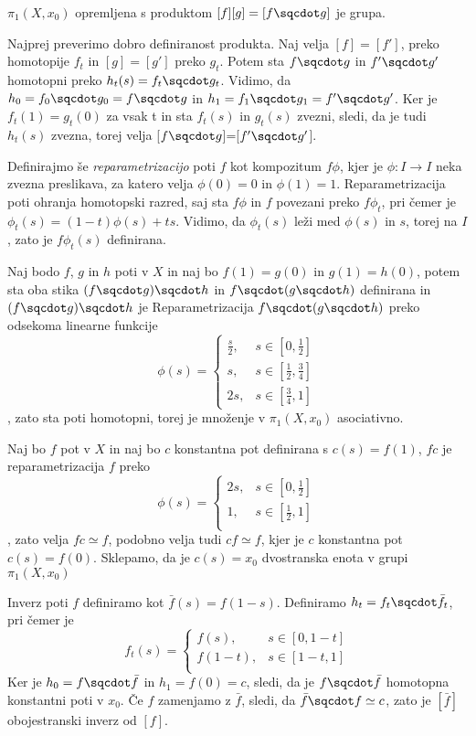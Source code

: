 \begin{izrek}
    $\pi_1(X,x_0)$ opremljena s produktom $[f][g] = [f\sqcdot g]$ je grupa.
\end{izrek}

\begin{dokaz}
    Najprej preverimo dobro definiranost produkta. Naj velja $[f]=[f']$, preko homotopije $f_t$ in $[g]=[g']$ preko $g_t$. Potem sta $f\sqcdot g$ in $f'\sqcdot g'$ homotopni preko
    $h_t(s) =f_t \sqcdot g_t$. Vidimo, da $h_0=f_0 \sqcdot g_0=f\sqcdot g$ in $h_1=f_1 \sqcdot g_1=f'\sqcdot g'$. Ker je $f_t(1)=g_t(0)$ za vsak t in sta $f_t(s)$ in $g_t(s)$ zvezni, sledi, da je tudi $h_t(s)$ zvezna, torej velja [$f\sqcdot g$]=[$f'\sqcdot g'$].

    Definirajmo še \textit{reparametrizacijo} poti $f$ kot kompozitum $f \phi$, kjer je $\phi: I \rightarrow I$ neka zvezna preslikava, za katero velja $\phi(0)= 0$ in $\phi(1)=1$. Reparametrizacija poti ohranja homotopski razred, saj sta $f\phi$ in $f$ povezani preko $f\phi_t$, pri čemer je $\phi_t(s)=(1-t)\phi(s)+ts$. Vidimo, da $\phi_t(s)$ leži med $\phi(s)$ in $s$, torej na $I$, zato je $f\phi_t(s)$ definirana.

    Naj bodo $f$, $g$ in $h$ poti v $X$ in naj bo $f(1)=g(0)$ in $g(1)=h(0)$, potem sta oba stika $(f\sqcdot g) \sqcdot h$ in $f\sqcdot (g \sqcdot h)$ definirana in $(f\sqcdot g) \sqcdot h$ je Reparametrizacija $f\sqcdot (g \sqcdot h)$ preko odsekoma linearne funkcije 
    $$
    \phi(s)=\begin{cases}
        \frac{s}{2}, &s \in [0,\frac{1}{2}] \\
        s, & s \in [\frac{1}{2},\frac{3}{4}]\\
        2s, & s \in [\frac{3}{4},1]
    \end{cases}
    $$, zato sta poti homotopni, torej je množenje v $\pi_1(X,x_0)$ asociativno.

    Naj bo $f$ pot v $X$ in naj bo $c$ konstantna pot definirana s $c(s)=f(1)$, $fc$ je reparametrizacija $f$ preko 
    $$\phi(s)=\begin{cases}
        2s, &s \in [0,\frac{1}{2}] \\
        1, & s \in [\frac{1}{2},1]\\
        \end{cases}
    $$, zato velja $fc\simeq f$, podobno velja tudi  $cf\simeq f$, kjer je $c$ konstantna pot $c(s)=f(0)$. Sklepamo, da je $c(s)=x_0$ dvostranska enota v grupi  $\pi_1(X,x_0)$

    Inverz poti $f$ definiramo kot $\bar{f}(s)=f(1-s)$. Definiramo $h_t=f_t\sqcdot \bar{f_t}$, pri čemer je 
    $$
    f_t(s)=
    \begin{cases}
        f(s), &s \in [0,1-t] \\
        f(1-t), & s \in [1-t,1] \\
        \end{cases}
$$
Ker je $h_0=f\sqcdot \bar{f}$ in $h_1=f(0)=c$, sledi, da je $f\sqcdot \bar{f}$ homotopna konstantni poti v $x_0$. Če $f$ zamenjamo z $\bar{f}$, sledi, da $\bar{f}\sqcdot f\simeq c$, zato je $[\bar{f}]$ obojestranski inverz od $[f]$.
\end{dokaz}

